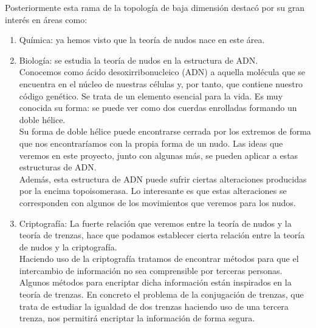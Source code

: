Posteriormente esta rama de la topología de baja dimensión destacó por su gran interés en áreas como:
  \begin{enumerate}
  	\item Química: ya hemos visto que la teoría de nudos nace en este área.
  	\item Biología: se estudia la teoría de nudos en la estructura de ADN.\\
  	Conocemos como ácido desoxirribonucleico (ADN) a aquella molécula que se encuentra en el núcleo de nuestras células y, por tanto, que contiene nuestro código genético. Se trata de un elemento esencial para la vida. Es muy conocida su forma: se puede ver como dos cuerdas enrolladas formando un doble hélice. \\
  	
  	Su forma de doble hélice puede encontrarse cerrada por los extremos de forma que nos encontraríamos con la propia forma de un nudo. Las ideas que veremos en este proyecto, junto con algunas más, se pueden aplicar a estas estructuras de ADN.\\
  	
  	Además, esta estructura de ADN puede sufrir ciertas alteraciones producidas por la encima topoisomerasa. Lo interesante es que estas alteraciones se corresponden con algunos de los movimientos que veremos para los nudos.\\
  	
  	
  	\item Criptografía: 
  	La fuerte relación que veremos entre la teoría de nudos y la teoría de trenzas, hace que podamos establecer cierta relación entre la teoría de nudos y la criptografía. \\
  	
  	Haciendo uso de la criptografía tratamos de encontrar métodos para que el intercambio de información no sea comprensible por terceras personas.\\
  	
  	Algunos métodos para encriptar dicha información están inspirados en la teoría de trenzas. En concreto el problema de la conjugación de trenzas, que trata de estudiar la igualdad de dos trenzas haciendo uso de una tercera trenza, nos permitirá encriptar la información de forma segura. \\
  \end{enumerate}
